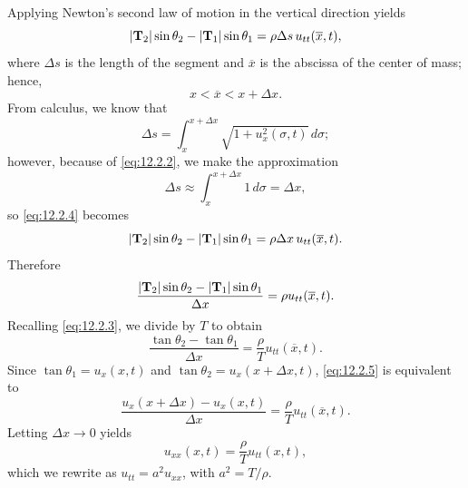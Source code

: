 Applying Newton's second law of motion in the vertical direction yields
\begin{equation}
  \label{eq:12.2.4}|{\bf T}_{2}|\sin\theta_{2}-|{\bf T}_{1}|\sin\theta_{1}=\rho\Delta s\,u_{tt}(\overline{x},t),
\end{equation}
where $\Delta s$ is the length of the segment and $\overline{x}$ is the abscissa of the center of
mass; hence,
\[
  x<\overline{x}<x+\Delta x.
\]
From calculus, we know that
\[
  \Delta s=\int_{x}^{x+\Delta x}\sqrt{1+u_{x}^{2}(\sigma,t)}\,d\sigma;
\]
however, because of \eqref{eq:12.2.2}, we make the approximation
\[
  \Delta s\approx\int_{x}^{x+\Delta x}1\,d\sigma=\Delta x,
\]
so \eqref{eq:12.2.4} becomes
\[
  |{\bf T}_{2}|\sin\theta_{2}-|{\bf T}_{1}|\sin\theta_{1}=\rho\Delta x\,u_{tt}(\overline{x},t).
\]
Therefore
\[
  \frac{|{\bf T}_{2}|\sin\theta_{2}-|{\bf T}_{1}|\sin\theta_{1}}{\Delta x}=\rho u_{tt}(\overline{x},t).
\]
Recalling \eqref{eq:12.2.3}, we divide by $T$ to obtain
\begin{equation}
  \label{eq:12.2.5}\frac{\tan\theta_{2}-\tan\theta_{1}}{\Delta x}= \frac{\rho}{T}u_{tt}(\overline{x},t).
\end{equation}
Since $\tan\theta_{1}=u_{x}(x,t)$ and $\tan\theta_{2}=u_{x}(x+\Delta x,t)$, \eqref{eq:12.2.5} is
equivalent to
\[
  \frac{u_{x}(x+\Delta x)-u_{x}(x,t)}{\Delta x}= \frac{\rho}{T}u_{tt}(\overline{x},t).
\]
Letting $\Delta x\to0$ yields
\[
  u_{xx}(x,t)=\frac{\rho}{T}u_{tt}(x,t),
\]
which we rewrite as $u_{tt}=a^{2}u_{xx}$, with $a^{2}=T/\rho$.


